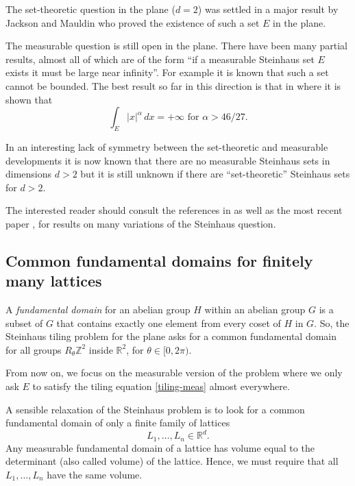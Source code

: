 \documentclass[12pt,a4paper,oneside]{amsart}
\theoremstyle{plain}
\theoremstyle{definition}
\newcommand{\Abs}[1]{{\left|{#1}\right|}}
\newcommand{\RR}{{\mathbb R}}
\newcommand{\ZZ}{{\mathbb Z}}
\begin{document}
The set-theoretic question in the plane ($d=2$) was settled in a major result by Jackson and Mauldin \cite{jackson2002lattice,jackson2002sets,jackson2003survey} who proved the existence of such a set $E$ in the plane. 

The measurable question is still open in the plane. There have been many partial results, almost all of which are of the form ``if a measurable Steinhaus set $E$ exists it must be large near infinity''. For example it is known \cite{beck1989lattice,kolountzakis1996problem} that such a set cannot be bounded. The best result so far in this direction is that in \cite{kolountzakis1999steinhaus} where it is shown that
$$
\int_E \Abs{x}^\alpha\,dx = +\infty \text{ for } \alpha > 46/27.
$$

In an interesting lack of symmetry between the set-theoretic and measurable developments it is now known  \cite{kolountzakis1999steinhaus,kolountzakis2002steinhaus} that there are no measurable Steinhaus sets in dimensions $d>2$ but it is still unknown if there are ``set-theoretic'' Steinhaus sets for $d>2$.

The interested reader should consult the references in  \cite{kolountzakis2017measurable} as well as the most recent paper \cite{kiss2024solutions}, for results on many variations of the Steinhaus question.

\subsection{Common fundamental domains for finitely many lattices}\label{ss:multi}

A \textit{fundamental domain} for an abelian group $H$ within an abelian group $G$ is a subset of $G$ that contains exactly one element from every coset of $H$ in $G$. So, the Steinhaus tiling problem for the plane asks for a common fundamental domain for all groups $R_\theta \ZZ^2$ inside $\RR^2$, for $\theta \in [0, 2\pi)$.

From now on, we focus on the measurable version of the problem where we only ask $E$ to satisfy the tiling equation \eqref{tiling-meas} almost everywhere.

A sensible relaxation of the Steinhaus problem is to look for a common fundamental domain of only a finite family of lattices
\begin{equation}\label{collection}
{L_1, \ldots, L_n \in \RR^d}.
\end{equation}
Any measurable fundamental domain of a lattice has volume equal to the determinant (also called volume) of the lattice. Hence, we must require that all {$L_1, \ldots, L_n$} have the same volume.
\end{document}
